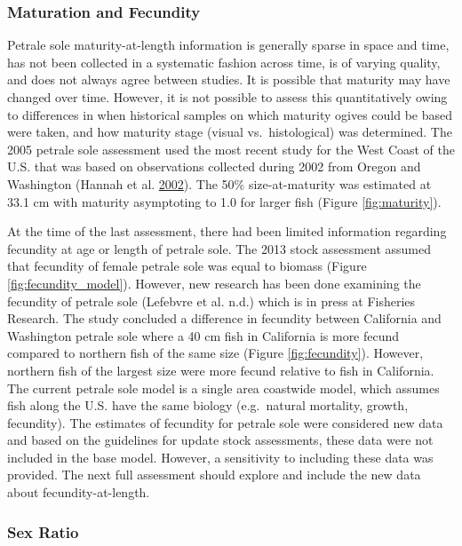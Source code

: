 \documentclass[12pt,]{article}
\begin{document}
\subsubsection{Maturation and Fecundity}\label{maturation-and-fecundity}

Petrale sole maturity-at-length information is generally sparse in space
and time, has not been collected in a systematic fashion across time, is
of varying quality, and does not always agree between studies. It is
possible that maturity may have changed over time. However, it is not
possible to assess this quantitatively owing to differences in when
historical samples on which maturity ogives could be based were taken,
and how maturity stage (visual vs.~histological) was determined. The
2005 petrale sole assessment used the most recent study for the West
Coast of the U.S. that was based on observations collected during 2002
from Oregon and Washington (Hannah et al.
\protect\hyperlink{ref-hannah_length_2002}{2002}). The 50\%
size-at-maturity was estimated at 33.1 cm with maturity asymptoting to
1.0 for larger fish (Figure \ref{fig:maturity}).

At the time of the last assessment, there had been limited information
regarding fecundity at age or length of petrale sole. The 2013 stock
assessment assumed that fecundity of female petrale sole was equal to
biomass (Figure \ref{fig:fecundity_model}). However, new research has
been done examining the fecundity of petrale sole (Lefebvre et al. n.d.)
which is in press at Fisheries Research. The study concluded a
difference in fecundity between California and Washington petrale sole
where a 40 cm fish in California is more fecund compared to northern
fish of the same size (Figure \ref{fig:fecundity}). However, northern
fish of the largest size were more fecund relative to fish in
California. The current petrale sole model is a single area coastwide
model, which assumes fish along the U.S. have the same biology
(e.g.~natural mortality, growth, fecundity). The estimates of fecundity
for petrale sole were considered new data and based on the guidelines
for update stock assessments, these data were not included in the base
model. However, a sensitivity to including these data was provided. The
next full assessment should explore and include the new data about
fecundity-at-length.

\subsubsection{Sex Ratio}\label{sex-ratio}
\end{document}
